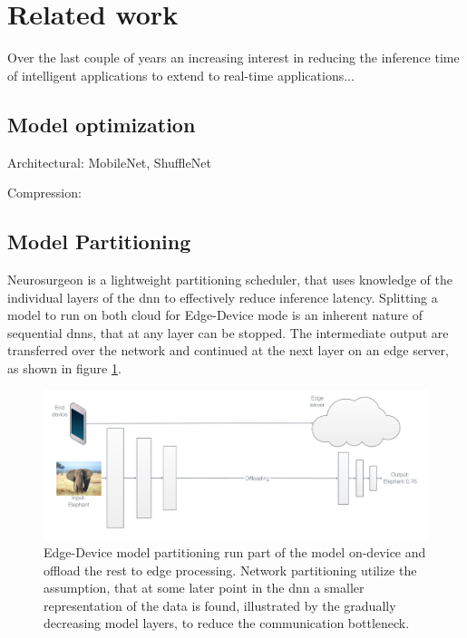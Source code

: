\section{Related work}

Over the last couple of years an increasing interest in reducing the inference time of intelligent applications to extend to real-time applications...

\subsection{Model optimization} 

Architectural: MobileNet, ShuffleNet

Compression: \cite{courbariaux_binaryconnect:_2015}

\subsection{Model Partitioning}

Neurosurgeon \cite{kang_neurosurgeon:_2017} is a lightweight partitioning scheduler, that uses knowledge of the individual layers of the \gls{dnn} to effectively reduce inference latency. Splitting a model to run on both cloud for Edge-Device mode is an inherent nature of sequential \gls{dnn}s, that at any layer can be stopped. The intermediate output are transferred over the network and continued at the next layer on an edge server, as shown in figure \ref{fig:offlaoding}.

\begin{figure}
	\centering
	\includegraphics[width=\linewidth]{figures/models/offloading}
	\caption[Model partitioning]{Edge-Device model partitioning run part of the model on-device and offload the rest to edge processing. Network partitioning utilize the assumption, that at some later point in the \gls{dnn} a smaller representation of the data is found, illustrated by the gradually decreasing model layers, to reduce the communication bottleneck. }
	\label{fig:offlaoding}
\end{figure}

